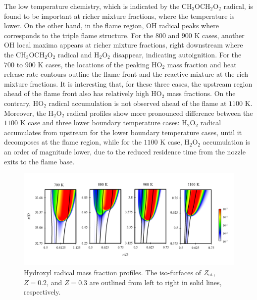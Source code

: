 \documentclass[review,3p,times]{elsarticleUS}
\begin{document}
The low temperature chemistry, which is indicated by the CH$_3$OCH$_2$O$_2$ radical, is found to be important at richer mixture fractions, where the temperature is lower.  On the other hand, in the flame region, OH radical peaks where corresponds to the triple flame structure.  For the $800$ and $900$ K cases, another OH local maxima appears at richer mixture fractions, right downstream where the CH$_3$OCH$_2$O$_2$ radical and H$_2$O$_2$ disappear, indicating autoignition.  For the $700$ to $900$ K cases, the locations of the peaking HO$_2$ mass fraction and heat release rate contours outline the flame front and the reactive mixture at the rich mixture fractions.  It is interesting that, for these three cases, the upstream region ahead of the flame front also has relatively high HO$_2$ mass fractions.  On the contrary, HO$_2$ radical accumulation is not observed ahead of the flame at $1100$ K.  Moreover, the H$_2$O$_2$ radical profiles show more pronounced difference between the $1100$ K case and three lower boundary temperature cases: H$_2$O$_2$ radical accumulates from upstream for the lower boundary temperature cases, until it decomposes at the flame region, while for the $1100$ K case, H$_2$O$_2$ accumulation is an order of magnitude lower, due to the reduced residence time from the nozzle exits to the flame base.

\begin{figure}[t]
  \centering
  \scriptsize
  \vspace{-0.1in}
  \includegraphics[width=1.0\textwidth]{OH.png}
  \normalsize
  \vspace{-0.1in}
  \caption{Hydroxyl radical mass fraction profiles.  The iso-furfaces of $Z_{\rm st}$, $Z = 0.2$, and $Z = 0.3$ are outlined from left to right in solid lines, respectively.}
  \label{fig:OH}
\end{figure}
\end{document}
